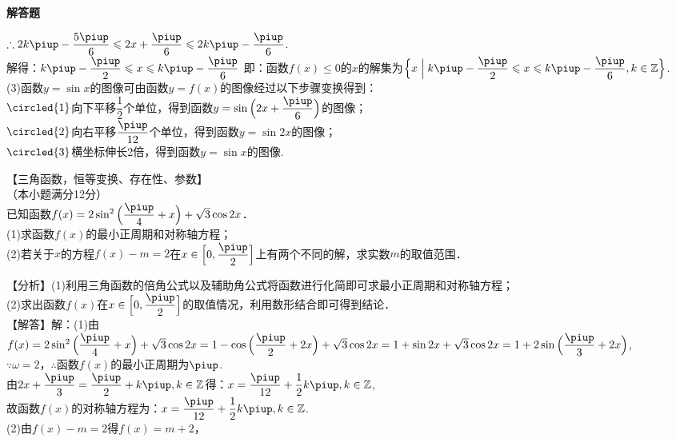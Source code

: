 \begin{exercise}{\bf 解答题}
\begin{answer}
        $\therefore 2k\piup-\dfrac{5\piup}6 \leqslant 2x+\dfrac{\piup}6 \leqslant 2k\piup-\dfrac{\piup}6$.\\
        解得：$k\piup-\dfrac{\piup}2 \leqslant x \leqslant k\piup-\dfrac{\piup}6$
        即：函数$f(x)\leqslant0$的$x$的解集为$\Bigl\{x\Bigm| k\piup-\dfrac{\piup}2 \leqslant x \leqslant k\piup-\dfrac{\piup}6,k\in\mathbb{Z}\Bigr\}$.\\
        (3)函数$y=\sin x$的图像可由函数$y=f(x)$的图像经过以下步骤变换得到：\\
        $\circled{1}$向下平移$\dfrac12$个单位，得到函数$y=\sin{\Bigl(2x+\dfrac{\piup}6\Bigr)}$的图像；\\
        $\circled{2}$向右平移$\dfrac{\piup}{12}$个单位，得到函数$y=\sin {2x}$的图像；\\
        $\circled{3}$横坐标伸长2倍，得到函数$y=\sin x$的图像.
      \end{answer}
    \item 【三角函数，恒等变换、存在性、参数】\\
      （本小题满分12分）\\
      已知函数$f(x)=2\sin^2{\Bigl(\dfrac{\piup}4+x\Bigr)}+\sqrt3\cos{2x}$．\\
      (1)求函数$f(x)$的最小正周期和对称轴方程；\\
      (2)若关于$x$的方程$f(x)-m=2$在$x\in\Bigl[0,\dfrac{\piup}2\Bigr]$上有两个不同的解，求实数$m$的取值范围．
      \begin{answer}
        【分析】(1)利用三角函数的倍角公式以及辅助角公式将函数进行化简即可求最小正周期和对称轴方程；\\
        (2)求出函数$f(x)$在$x\in\Bigl[0,\dfrac{\piup}2\Bigr]$的取值情况，利用数形结合即可得到结论．\\
        【解答】解：(1)由$f(x)=2\sin^2{\Bigl(\dfrac{\piup}4+x\Bigr)}+\sqrt3\cos{2x}
        =1-\cos{\Bigl(\dfrac{\piup}2+2x\Bigr)}+\sqrt3\cos{2x}
        =1+\sin{2x}+\sqrt3\cos{2x}=1+2\sin{\Bigl(\dfrac{\piup}3+2x\Bigr)}$,\\
        $\because \omega=2$，$\therefore$函数$f(x)$的最小正周期为$\piup$.\\
        由$2x+\dfrac{\piup}3=\dfrac{\piup}2+k\piup,k\in\mathbb{Z}$得：$x=\dfrac{\piup}{12}+\dfrac12k\piup,{k\in\mathbb{Z}}$,\\
        故函数$f(x)$的对称轴方程为：$x=\dfrac{\piup}{12}+\dfrac12k\piup,{k\in\mathbb{Z}}$.\\
        (2)由$f(x)-m=2$得$f(x)=m+2$，\\
        \begin{tikzpicture}[declare function={f(\k)=1+2*sin(deg(2*\k+pi/3));}]

\end{tikzpicture}
\end{answer}
\end{exercise}
